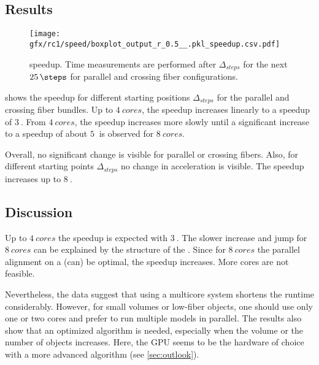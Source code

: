 \subsection{Results}
% 
\begin{figure}[!t]
\centering
\texttt{[image: gfx/rc1/speed/boxplot\_output\_r\_0.5\_\_.pkl\_speedup.csv.pdf]}
\caption{ speedup. Time measurements are performed after $\Delta_{\mathit{steps}}$ for the next $\SI{25}{\steps}$ for parallel \pfbs{} and crossing \cfbs{} fiber configurations.}
\label{fig:solverSpeedup}
\end{figure}
% 
 shows the speedup for different starting positions $\Delta_{\mathit{steps}}$ for the parallel \pfbs{} and crossing \cfbs{} fiber bundles.
Up to $\SI{4}{cores}$, the speedup increases linearly to a speedup of $\SI{3}{}$.
From $\SI{4}{cores}$, the speedup increases more slowly until a significant increase to a speedup of about $\SI{5}{}$ is observed for $\SI{8}{cores}$.
\par
% 
Overall, no significant change is visible for parallel or crossing fibers.
Also, for different starting points $\Delta_{\mathit{steps}}$ no change in acceleration is visible.
The speedup increases up to $\SI{8}{}$.
% 
% 
% 
\subsection{Discussion}
% 
Up to $\SI{4}{cores}$ the speedup is expected with $\SI{3}{}$.
The slower increase and jump for $\SI{8}{cores}$ can be explained by the structure of the .
Since for $\SI{8}{cores}$ the parallel alignment on a  (can) be optimal, the speedup increases.
More cores are not feasible.
\par
% 
Nevertheless, the data suggest that using a multicore system shortens the runtime considerably.
However, for small volumes or low-fiber objects, one should use only one or two cores and prefer to run multiple models in parallel.
The results also show that an optimized algorithm is needed, especially when the volume or the number of objects increases.
Here, the \ac{GPU} seems to be the hardware of choice with a more advanced algorithm \cite{Karras2012} (see \cref{sec:outlook}).